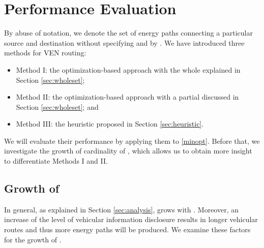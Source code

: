 \documentclass[journal]{IEEEtran}
\begin{document}
\section{Performance Evaluation} \label{sec:performance}

By abuse of notation, we denote the set of energy paths connecting a particular source and destination without specifying  and  by . We have introduced three methods for VEN routing:
\begin{itemize}
	\item Method I: the optimization-based approach with the whole  explained in Section \ref{sec:wholeset};
	\item Method II: the optimization-based approach with a partial  discussed in Section \ref{sec:wholeset}; and
	\item Method III: the heuristic proposed in Section \ref{sec:heuristic}.
\end{itemize} 
We will evaluate their performance by applying them to \eqref{minopt}. Before that, we investigate the growth of cardinality of , which allows us to obtain more insight to differentiate Methods I and II. 

\subsection{Growth of }
In general, as explained in Section \ref{sec:analysis},   grows with . Moreover, an increase of the level of vehicular information disclosure results in longer vehicular routes and thus more energy paths will be produced. We examine these factors for the growth of  .
\end{document}
